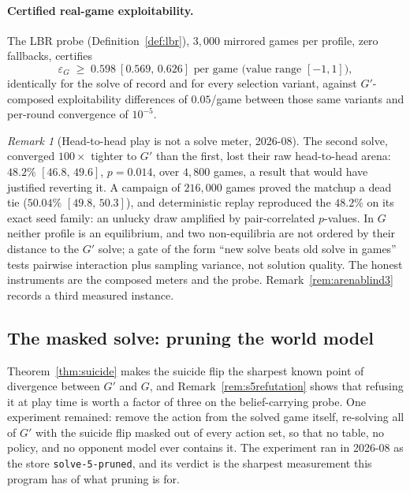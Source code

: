 \documentclass[11pt]{article}
\theoremstyle{plain}
\theoremstyle{definition}
\theoremstyle{remark}
\newtheorem{remark}[theorem]{Remark}
\newcommand{\code}[1]{\texttt{\small #1}}
\newcommand{\game}{\ensuremath{G}}
\newcommand{\gp}{\ensuremath{G'}}
\newcommand{\epsG}{\ensuremath{\varepsilon_{\game}}}
\begin{document}
\paragraph{Certified real-game exploitability.} The LBR probe
(Definition~\ref{def:lbr}), $3{,}000$ mirrored games per profile, zero
fallbacks, certifies
\[
  \epsG \;\ge\; 0.598\ [0.569,\,0.626] \text{ per game (value range }
  [-1,1]\text{)},
\]
identically for the solve of record and for every selection variant,
against $\gp$-composed exploitability differences of $0.05$/game
between those same variants and per-round convergence of $10^{-5}$.

\begin{remark}[Head-to-head play is not a solve meter, 2026-08]
\label{rem:headtohead}
The second solve, converged $100\times$ tighter to $\gp$ than the
first, lost their raw head-to-head arena: $48.2\%$ $[46.8,\,49.6]$,
$p=0.014$, over $4{,}800$ games, a result that would have justified
reverting it. A campaign of $216{,}000$ games proved the matchup a dead
tie ($50.04\%$ $[49.8,\,50.3]$), and deterministic replay reproduced
the $48.2\%$ on its exact seed family: an unlucky draw amplified by
pair-correlated $p$-values. In $\game$ neither profile is an
equilibrium, and two non-equilibria are not ordered by their distance
to the $\gp$ solve; a gate of the form ``new solve beats old solve in
games'' tests pairwise interaction plus sampling variance, not solution
quality. The honest instruments are the composed meters and the probe.
Remark~\ref{rem:arenablind3} records a third measured instance.
\end{remark}

\subsection{The masked solve: pruning the world model}
\label{sec:maskedsolve}

Theorem~\ref{thm:suicide} makes the suicide flip the sharpest known
point of divergence between $\gp$ and $\game$, and
Remark~\ref{rem:s5refutation} shows that refusing it at play time is
worth a factor of three on the belief-carrying probe. One experiment
remained: remove the action from the solved game itself, re-solving
all of $\gp$ with the suicide flip masked out of every action set, so
that no table, no policy, and no opponent model ever contains it. The
experiment ran in 2026-08 as the store \code{solve-5-pruned}, and its
verdict is the sharpest measurement this program has of what pruning
is for.
\end{document}
